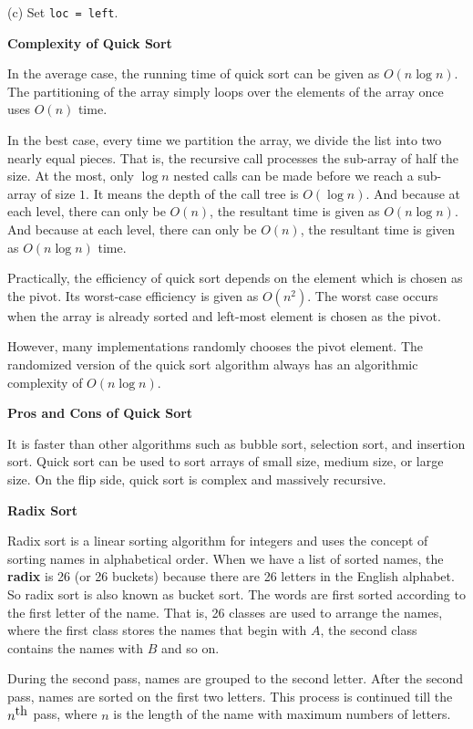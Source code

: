 \vskip 3mm
\qquad\qquad(c) Set {\tt loc = left}.

\vskip 3mm
{\bf Complexity of Quick Sort}

\vskip 1mm
In the average case, the running time of quick sort can be given as $O(n\log n)$. The partitioning of the array simply loops over the elements of the array once uses $O(n)$ time.

\vskip 1mm
In the best case, every time we partition the array, we divide the list into two nearly equal pieces. That is, the recursive call processes the sub-array of half the size. At the most, only $\log n$ nested calls can be made before we reach a sub-array of size $1$. It means the depth of the call tree is $O(\log n)$. And because at each level, there can only be $O(n)$, the resultant time is given as $O(n\log n)$. And because at each level, there can only be $O(n)$, the resultant time is given as $O(n\log n)$ time.

\vskip 1mm
Practically, the efficiency of quick sort depends on the element which is chosen as the pivot. Its worst-case efficiency is given as $O(n^2)$. The worst case occurs when the array is already sorted and left-most element is chosen as the pivot.

\vskip 1mm
However, many implementations randomly chooses the pivot element. The randomized version of the quick sort algorithm always has an algorithmic complexity of $O(n\log n)$.

\vskip 3mm
{\bf Pros and Cons of Quick Sort}

\vskip 1mm
It is faster than other algorithms such as bubble sort, selection sort, and insertion sort. Quick sort can be used to sort arrays of small size, medium size, or large size. On the flip side, quick sort is complex and massively recursive.

\filbreak
\vskip 1cm
{\bf Radix Sort}

\vskip 1mm
Radix sort is a linear sorting algorithm for integers and uses the concept of sorting names in alphabetical order. When we have a list of sorted names, the {\bf radix} is 26 (or 26 buckets) because there are 26 letters in the English alphabet. So radix sort is also known as bucket sort. The words are first sorted according to the first letter of the name. That is, 26 classes are used to arrange the names, where the first class stores the names that begin with $A$, the second class contains the names with $B$ and so on.

\vskip 1mm
During the second pass, names are grouped to the second letter. After the second pass, names are sorted on the first two letters. This process is continued till the $n^{\hbox{th}}$ pass, where $n$ is the length of the name with maximum numbers of letters.

